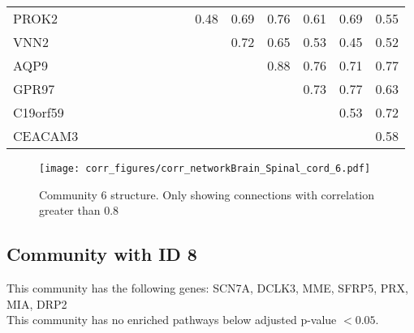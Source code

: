\begin{longtable}{lrrrrrrrrrrrrrr}
PROK2    &              &               &              &              &             &             &             &             &       0.48 &       0.69 &        0.76 &           0.61 &          0.69 &       0.55 \\
VNN2     &              &               &              &              &             &             &             &             &            &       0.72 &        0.65 &           0.53 &          0.45 &       0.52 \\
AQP9     &              &               &              &              &             &             &             &             &            &            &        0.88 &           0.76 &          0.71 &       0.77 \\
GPR97    &              &               &              &              &             &             &             &             &            &            &             &           0.73 &          0.77 &       0.63 \\
C19orf59 &              &               &              &              &             &             &             &             &            &            &             &                &          0.53 &       0.72 \\
CEACAM3  &              &               &              &              &             &             &             &             &            &            &             &                &               &       0.58 \\
\end{longtable}


\begin{figure}[h!]
\centering
\texttt{[image: corr\_figures/corr\_networkBrain\_Spinal\_cord\_6.pdf]}
\caption{Community 6 structure. Only showing connections with correlation greater than 0.8}
\end{figure}




\subsection*{Community with ID 8}
This community has the following genes: SCN7A, DCLK3, MME, SFRP5, PRX, MIA, DRP2
\\
This community has no enriched pathways below adjusted p-value $< 0.05$.

